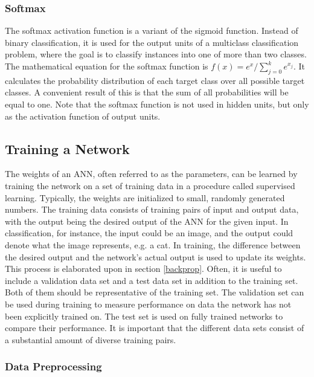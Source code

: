 \subsubsection{Softmax}

The softmax activation function is a variant of the sigmoid function. Instead of binary classification, it is used for the output units of a multiclass classification problem, where the goal is to classify instances into one of more than two classes. The mathematical equation for the softmax function is $f(x) = e^x/\sum_{j=0}^k e^{x_j}$. It calculates the probability distribution of each target class over all possible target classes. A convenient result of this is that the sum of all probabilities will be equal to one. Note that the softmax function is not used in hidden units, but only as the activation function of output units.

\subsection{Training a Network} \label{training-sec}

The weights of an ANN, often referred to as the parameters, can be learned by training the network on a set of training data in a procedure called supervised learning. Typically, the weights are initialized to small, randomly generated numbers. The training data consists of training pairs of input and output data, with the output being the desired output of the ANN for the given input. In classification, for instance, the input could be an image, and the output could denote what the image represents, e.g. a cat. In training, the difference between the desired output and the network's actual output is used to update its weights. This process is elaborated upon in section \ref{backprop}. Often, it is useful to include a validation data set and a test data set in addition to the training set. Both of them should be representative of the training set. The validation set can be used during training to measure performance on data the network has not been explicitly trained on. The test set is used on fully trained networks to compare their performance. It is important that the different data sets consist of a substantial amount of diverse training pairs.

\subsubsection{Data Preprocessing}

